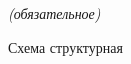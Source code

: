 \label{sec:sec_add_b}


\begin{center}
	\normalfont\normalsize{\textit{(обязательное)}}

	\normalfont\normalsize{Схема структурная}
\end{center}

\clearpage
